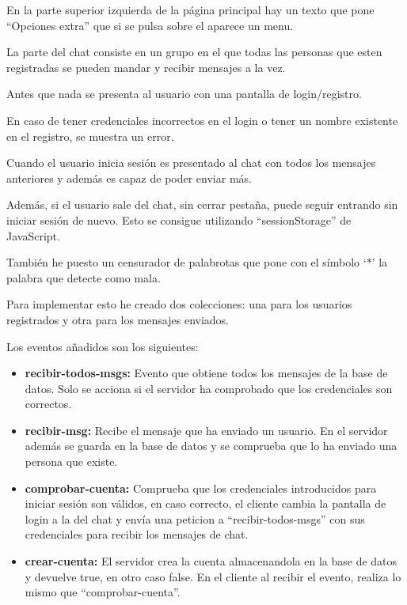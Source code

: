 \documentclass{article}
\begin{document}


En la parte superior izquierda de la página principal hay un texto que pone ``Opciones extra'' que si se pulsa sobre el aparece un menu.


La parte del chat consiste en un grupo en el que todas las personas que esten registradas se pueden mandar y recibir mensajes a la vez.

Antes que nada se presenta al usuario con una pantalla de login/registro.


En caso de tener credenciales incorrectos en el login o tener un nombre existente en el registro, se muestra un error.


Cuando el usuario inicia sesión es presentado al chat con todos los mensajes anteriores y además es capaz de poder enviar más.


Además, si el usuario sale del chat, sin cerrar pestaña, puede seguir entrando sin iniciar sesión de nuevo. Esto se consigue utilizando ``sessionStorage'' de JavaScript.

También he puesto un censurador de palabrotas que pone con el símbolo `*' la palabra que detecte como mala.


Para implementar esto he creado dos colecciones: una para los usuarios registrados y otra para los mensajes enviados.

Los eventos añadidos son los siguientes:

\begin{itemize}
    \item \textbf{recibir-todos-msgs: }Evento que obtiene todos los mensajes de la base de datos. Solo se acciona si el servidor ha comprobado que los credenciales son correctos.
    \item \textbf{recibir-msg: }Recibe el mensaje que ha enviado un usuario. En el servidor además se guarda en la base de datos y se comprueba que lo ha enviado una persona que existe.
    \item \textbf{comprobar-cuenta: }Comprueba que los credenciales introducidos para iniciar sesión son válidos, en caso correcto, el cliente cambia la pantalla de login a la del chat y envía una peticion a ``recibir-todos-msgs'' con sus credenciales para recibir los mensajes de chat.
    \item \textbf{crear-cuenta: }El servidor crea la cuenta almacenandola en la base de datos y devuelve true, en otro caso false. En el cliente al recibir el evento, realiza lo mismo que ``comprobar-cuenta''.
\end{itemize}    
\end{document}
